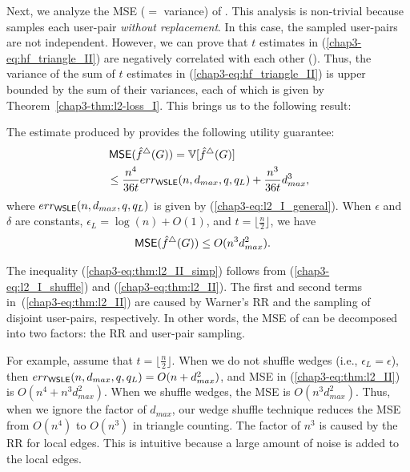 Next, we analyze the MSE ($=$ variance) of \AlgWSTri{}.
This analysis is 
non-trivial 
because \AlgWSTri{} samples each user-pair \textit{without replacement}.
In this case, the sampled user-pairs are not independent.
However, we can prove that
$t$ estimates in (\ref{chap3-eq:hf_triangle_II}) are negatively correlated with each other ().
Thus, the variance of the sum of $t$ estimates
in (\ref{chap3-eq:hf_triangle_II}) is upper bounded by the sum of their variances, each of which is given by Theorem~\ref{chap3-thm:l2-loss_I}.
This brings us to the following result:

\begin{theorem}
\label{chap3-thm:l2-loss_II}
The estimate produced by \AlgWSTri{} provides the following utility guarantee:
\begin{align}
& \operatorname{\textsf{MSE}}(\hat{f}^\triangle(G)) = \operatorname{\mathbb{V}}[\hat{f}^\triangle(G)] \nonumber\\
  &\leq
  \frac{n^4}{36t}err_{\textsf{WSLE}{}}(n,d_{max},q,q_L) +
  \frac{n^3}{36t}d_{max}^3, \label{chap3-eq:thm:l2_II}
\end{align}
where $err_{\textsf{WSLE}{}}(n,d_{max},q,q_L)$ is given by (\ref{chap3-eq:l2_I_general}).
  When $\epsilon$ and $\delta$ are constants,  $\epsilon_L = \log(n) + O(1)$, and
  $t = \lfloor\frac{n}{2}\rfloor$, we have
\begin{align}
\operatorname{\textsf{MSE}}(\hat{f}^\triangle(G))
  &\leq
  O(n^3d_{max}^2). \label{chap3-eq:thm:l2_II_simp}
\end{align}
\end{theorem}

The inequality (\ref{chap3-eq:thm:l2_II_simp}) follows from (\ref{chap3-eq:l2_I_shuffle}) and (\ref{chap3-eq:thm:l2_II}). 
The first and second terms in~(\ref{chap3-eq:thm:l2_II}) are caused by
Warner's RR
and the sampling of disjoint user-pairs, respectively.
In other words, the MSE of \AlgWSTri{} can be decomposed into two factors: the RR
and user-pair sampling.

For example, assume that $t = \lfloor \frac{n}{2} \rfloor$.
When we do not shuffle wedges (i.e., $\epsilon_L = \epsilon$), then
$err_{\textsf{WSLE}{}}(n,d_{max},q,q_L) = O(n + d_{max}^2)$, and
MSE in (\ref{chap3-eq:thm:l2_II}) is $O(n^4 + n^3 d_{max}^2)$.
When we shuffle wedges, the MSE is $O(n^3 d_{max}^2)$.
Thus, when we ignore the factor of $d_{max}$, our wedge shuffle technique reduces the MSE from $O(n^4)$ to $O(n^3)$ in triangle counting.
The factor of $n^3$ is caused by the RR for local edges.
This is intuitive because a large amount of noise is added to the local edges.

